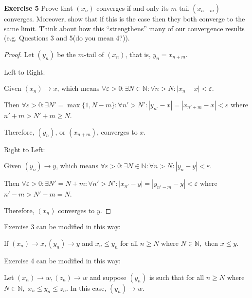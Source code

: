\documentclass[12pt]{article}
\newcommand{\bbN}{\mathbb{N}}
\theoremstyle{definition}
\numberwithin{equation}{subsection}
\begin{document}
\bigskip


\textbf{Exercise 5} Prove that $(x_n)$ converges if and only its $m$-tail $(x_{n+m} )$ converges. Moreover, show that if this is the case then they both
converge to the same limit. Think about how this ``strengthens''
many of our convergence results (e.g. Questions 3 and 5(do you mean 4?)).
\begin{proof}
    Let $(y_n)$ be the $m$-tail of $(x_n)$, that is, $y_n = x_{n+m}$.

    Left to Right:

    Given $\left(x_{n}\right) \rightarrow x$, which means $\forall \varepsilon > 0: \exists N \in \bbN: \forall n > N: |x_n-x| < \varepsilon$.
    
    Then $\forall \varepsilon > 0: \exists N' = \max\{1, N - m\}: \forall n' > N': |y_{n'}-x| = |x_{n'+m} - x| < \varepsilon$ where $n'+m > N'+m \geq N$.

    Therefore, $(y_n)$, or $(x_{n+m})$,  converges to $x$. 

    \bigskip
    Right to Left:

    Given $\left(y_{n}\right) \rightarrow y$, which means $\forall \varepsilon > 0: \exists N \in \bbN: \forall n > N: |y_n-y| < \varepsilon$.
    
    Then $\forall \varepsilon > 0: \exists N' = N+m: \forall n' > N': |x_{n'}-y| = |y_{n'-m} - y| < \varepsilon$ where $n'-m > N'-m = N$.

    Therefore, $(x_n)$  converges to $y$. 



\end{proof}


Exercise 3 can be modified in this way:

If $\left(x_{n}\right) \rightarrow x,\left(y_{n}\right) \rightarrow y$ and $x_{n} \leq y_{n}$ for all $n\geq N$ where $N \in \mathbb{N},$ then $x \leq y .$

\bigskip

Exercise 4 can be modified in this way:

Let $\left(x_{n}\right) \rightarrow w,\left(z_{n}\right) \rightarrow w$ and suppose $\left(y_{n}\right)$ is such that for all $n\geq N$ where $N \in \mathbb{N},$ $x_{n} \leq y_{n} \leq z_{n} .$ In this case, $\left(y_{n}\right) \rightarrow w .$

\bigskip
\end{document}
